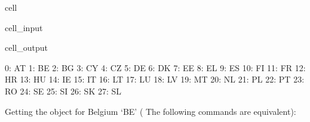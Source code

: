 \documentclass[letterpaper,10pt,english]{sphinxmanual}
\begin{document}
\begin{sphinxuseclass}{cell}
\begin{sphinxuseclass}{cell_input}
\begin{sphinxVerbatim}[commandchars=\\\{\}]
\end{sphinxVerbatim}

\end{sphinxuseclass}
\begin{sphinxuseclass}{cell_output}
\begin{sphinxVerbatim}[commandchars=\\\{\}]
0: AT 
1: BE 
2: BG 
3: CY 
4: CZ 
5: DE 
6: DK 
7: EE 
8: EL 
9: ES 
10: FI
11: FR
12: HR
13: HU
14: IE
15: IT
16: LT
17: LU
18: LV
19: MT
20: NL
21: PL
22: PT
23: RO
24: SE
25: SI
26: SK
27: SL
\end{sphinxVerbatim}

\end{sphinxuseclass}
\end{sphinxuseclass}
\sphinxAtStartPar
Getting the  object for Belgium ‘BE’ ( The following commands are equivalent):
\end{document}
